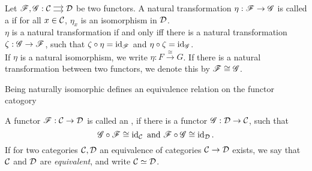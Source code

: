 \begin{defn}
  Let $\ffunc,\gfunc:\begin{tikzcd}[cramped, sep=small]\ccat\ar[shift left]{r}\ar[shift right]{r}&\dcat\end{tikzcd}$ be two functors. A natural transformation $\eta:\mathscr{F} \to \mathscr{G}$ is called a  if for all $x\in \mathcal{C}$, $\eta_x$ is an isomorphism in $\mathcal{D}$.\\
  $\eta$ is a natural transformation if and only iff there is a natural transformation $\zeta:\mathscr{G}\to \mathscr{F}$, such that $\zeta\circ \eta=\operatorname{id}_{\mathscr{F}}$ and $\eta\circ \zeta = \operatorname{id}_{\mathscr{G}}$.\\
  If $\eta$ is a natural isomorphism, we write $\eta: F\xrightarrow{\cong}G$. If there is a natural transformation between two functors, we denote this by $\mathscr{F} \cong \mathscr{G}$.
\end{defn}
\coms Being naturally isomorphic defines an equivalence relation on the functor catogory\come
\begin{defn}
  A functor $\mathscr{F}:\mathcal{C}\to \mathcal{D}$ is called an , if there is a functor $\mathscr{G}:\mathcal{D}\to \mathcal{C}$, such that
  \[
  \mathscr{G}\circ\mathscr{F} \cong \operatorname{id}_{\mathcal{C}}\text{ and }\mathscr{F} \circ \mathscr{G} \cong \operatorname{id}_{\mathcal{D}}.
  \]
  If for two categories $\mathcal{C},\mathcal{D}$ an equivalence of categories $\mathcal{C}\to\mathcal{D}$ exists, we say that $\mathcal{C}$ and $\mathcal{D}$ are \emph{equivalent}, and write $\mathcal{C} \simeq \mathcal{D}$.
\end{defn}
